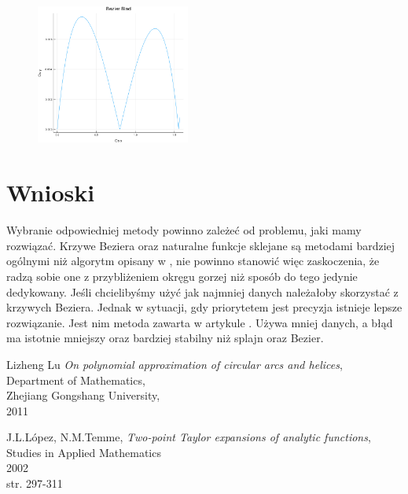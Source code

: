 \documentclass[paper=a4, fontsize=11pt]{scrartcl} %
\numberwithin{equation}{section} %
\numberwithin{figure}{section} %
\numberwithin{table}{section} %
\begin{document}
\begin{figure}
\centering
{\label{hermite}
\includegraphics[width=0.45\textwidth]{bezierblad}}
\end{figure}



\FloatBarrier

\section{Wnioski}
Wybranie odpowiedniej metody powinno zależeć od problemu, jaki mamy rozwiązać. Krzywe Beziera oraz naturalne funkcje sklejane są metodami bardziej ogólnymi niż algorytm opisany w \cite{hermite}, nie powinno stanowić więc zaskoczenia, że radzą sobie one z przybliżeniem okręgu gorzej niż sposób do tego jedynie dedykowany.  Jeśli chcielibyśmy użyć jak najmniej danych należałoby skorzystać z krzywych Beziera. Jednak w sytuacji, gdy priorytetem jest precyzja istnieje lepsze rozwiązanie. Jest nim metoda zawarta w artykule \cite{hermite}. Używa mniej danych, a błąd ma istotnie mniejszy oraz bardziej stabilny niż splajn oraz Bezier.
\begin{thebibliography}{9}

  Lizheng Lu
  \textit{On polynomial approximation of circular arcs and helices}, \\
  Department of Mathematics, \\
  Zhejiang Gongshang University, \\
  2011
    
 J.L.López,
 N.M.Temme,
 \textit{Two-point Taylor expansions of analytic functions},\\
 Studies in Applied Mathematics\\
 2002 \\
 str. 297-311
\end{thebibliography}
\end{document}
